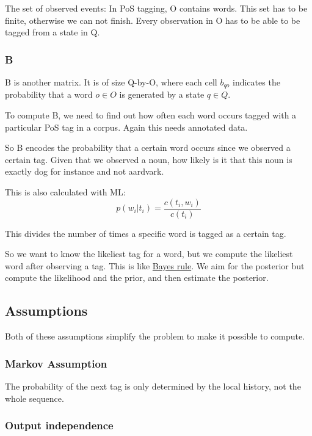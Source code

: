 \documentclass[
  11pt,
  british,
]{article}
\begin{document}
The set of observed events: In PoS tagging, O contains words. This set
has to be finite, otherwise we can not finish. Every observation in O
has to be able to be tagged from a state in Q.

\hypertarget{b}{%
\subsubsection{B}\label{b}}

B is another matrix. It is of size
\textbar Q\textbar-by-\textbar O\textbar, where each cell \(b_{qo}\)
indicates the probability that a word \(o \in O\) is generated by a
state \(q \in Q\).

To compute B, we need to find out how often each word occurs tagged with
a particular PoS tag in a corpus. Again this needs annotated data.

So B encodes the probability that a certain word occurs since we
observed a certain tag. Given that we observed a noun, how likely is it
that this noun is exactly dog for instance and not aardvark.

This is also calculated with ML:
\[p(w_{i}|t_{i}) = \frac{c(t_{i},w_{i})}{c(t_{i})}\]

This divides the number of times a specific word is tagged as a certain
tag.

So we want to know the likeliest tag for a word, but we compute the
likeliest word after observing a tag. This is like
\href{../Classification/Native\%20baiyes/Bayes\%20rule.md}{Bayes rule}.
We aim for the posterior but compute the likelihood and the prior, and
then estimate the posterior.

\hypertarget{assumptions}{%
\subsection{Assumptions}\label{assumptions}}

Both of these assumptions simplify the problem to make it possible to
compute.

\hypertarget{markov-assumption}{%
\subsubsection{Markov Assumption}\label{markov-assumption}}

The probability of the next tag is only determined by the local history,
not the whole sequence.

\hypertarget{output-independence}{%
\subsubsection{Output independence}\label{output-independence}}
\end{document}
